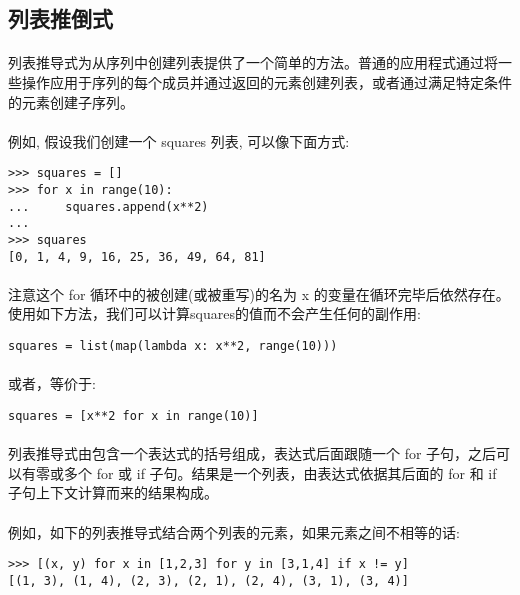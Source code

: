 \documentclass{article}
\begin{document}
\begin{CJK}{UTF8}{gbsn}
\section{列表推倒式}
\paragraph{}
列表推导式为从序列中创建列表提供了一个简单的方法。普通的应用程式通过将一些操作应用于序列的每个成员并通过返回的元素创建列表，或者通过满足特定条件的元素创建子序列。
\paragraph{}
例如, 假设我们创建一个 squares 列表, 可以像下面方式:
\begin{verbatim}
>>> squares = []
>>> for x in range(10):
...     squares.append(x**2)
...
>>> squares
[0, 1, 4, 9, 16, 25, 36, 49, 64, 81]
\end{verbatim}
\paragraph{}
注意这个 for 循环中的被创建(或被重写)的名为 x 的变量在循环完毕后依然存在。使用如下方法，我们可以计算squares的值而不会产生任何的副作用:
\begin{verbatim}
squares = list(map(lambda x: x**2, range(10)))
\end{verbatim}
\paragraph{}
或者，等价于:
\begin{verbatim}
squares = [x**2 for x in range(10)]
\end{verbatim}
\paragraph{}
列表推导式由包含一个表达式的括号组成，表达式后面跟随一个 for 子句，之后可以有零或多个 for 或 if 子句。结果是一个列表，由表达式依据其后面的 for 和 if 子句上下文计算而来的结果构成。
\paragraph{}
例如，如下的列表推导式结合两个列表的元素，如果元素之间不相等的话:
\begin{verbatim}
>>> [(x, y) for x in [1,2,3] for y in [3,1,4] if x != y]
[(1, 3), (1, 4), (2, 3), (2, 1), (2, 4), (3, 1), (3, 4)]
\end{verbatim}

\end{CJK}
\end{document}
